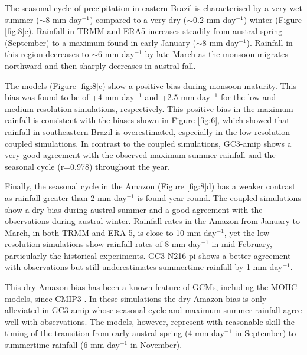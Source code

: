 The seasonal cycle of precipitation in eastern Brazil is characterised by a very wet summer ($\sim$8 mm day$^{-1}$) compared to a very dry ($\sim$0.2 mm day$^{-1}$) winter (Figure \ref{fig:8}c).
Rainfall in TRMM and ERA5 increases steadily from austral spring (September) to a maximum found in early January ($\sim$8 mm day$^{-1}$).
Rainfall in this region decreases to $\sim$6 mm day$^{-1}$ by late March as the monsoon migrates northward and then sharply decreases in austral fall.


The models (Figure \ref{fig:8}c) show a positive bias during monsoon maturity. This bias was found to be of +4 mm day$^{-1}$ and +2.5 mm day$^{-1}$ for the low and medium resolution simulations, respectively.
This positive bias in the maximum rainfall is consistent with the biases shown in Figure \ref{fig:6}, which showed that rainfall in southeastern Brazil is overestimated, especially in the low resolution coupled simulations.   In contrast to the coupled simulations, GC3-amip shows a very good agreement with the observed maximum summer rainfall and the seasonal cycle (r=0.978) throughout the year.

Finally, the seasonal cycle in the Amazon (Figure \ref{fig:8}d) has a weaker contrast as rainfall greater than 2 mm day$^{-1}$ is found year-round. The coupled simulations show a dry bias during austral summer and a good agreement with the observations during austral winter. Rainfall rates in the Amazon from January to March, in both TRMM and ERA-5, is close to 10 mm day$^{-1}$, yet the low resolution simulations show rainfall rates of 8 mm day$^{-1}$ in mid-February, particularly the historical experiments.
GC3 N216-pi shows a better agreement with observations but still underestimates summertime rainfall by 1 mm day$^{-1}$.   

This dry Amazon bias has been a known feature of GCMs, including the MOHC models, since CMIP3 \citep{li2006,yin2013}. In these simulations the dry Amazon bias is only alleviated in GC3-amip whose seasonal cycle and maximum summer rainfall agree well with observations.   
The models, however, represent with reasonable skill the timing of the transition from
early austral spring (4 mm day$^{-1}$ in September) to summertime rainfall (6 mm day$^{-1}$ in November).


